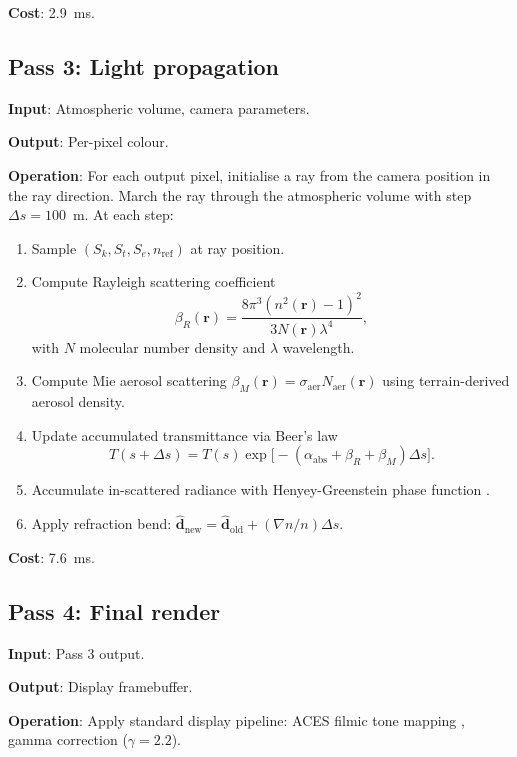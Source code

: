 \documentclass[11pt,twocolumn,a4paper]{article}
\theoremstyle{definition}
\theoremstyle{remark}
\newcommand{\Rvec}{\mathbf{r}}
\begin{document}
\textbf{Cost}: 2.9~ms.

\subsection{Pass 3: Light propagation}

\textbf{Input}: Atmospheric volume, camera parameters.

\textbf{Output}: Per-pixel colour.

\textbf{Operation}: For each output pixel, initialise a ray from the camera position in the ray direction. March the ray through the atmospheric volume with step $\Delta s = 100$~m. At each step:

\begin{enumerate}[nosep,leftmargin=1em]
\item Sample $(S_k, S_t, S_e, n_\text{ref})$ at ray position.
\item Compute Rayleigh scattering coefficient \citep{bohren1983}
\begin{equation}
\beta_R(\Rvec) = \frac{8\pi^3(n^2(\Rvec)-1)^2}{3 N(\Rvec)\lambda^4},
\end{equation}
with $N$ molecular number density and $\lambda$ wavelength.
\item Compute Mie aerosol scattering $\beta_M(\Rvec) = \sigma_\text{aer} N_\text{aer}(\Rvec)$ using terrain-derived aerosol density.
\item Update accumulated transmittance via Beer's law \citep{liou2002}
\begin{equation}
T(s+\Delta s) = T(s) \exp\big[-(\alpha_\text{abs} + \beta_R + \beta_M)\Delta s\big].
\end{equation}
\item Accumulate in-scattered radiance with Henyey-Greenstein phase function \citep{henyey1941}.
\item Apply refraction bend: $\hat{\mathbf{d}}_\text{new} = \hat{\mathbf{d}}_\text{old} + (\nabla n/n)\Delta s$.
\end{enumerate}

\textbf{Cost}: 7.6~ms.

\subsection{Pass 4: Final render}

\textbf{Input}: Pass 3 output.

\textbf{Output}: Display framebuffer.

\textbf{Operation}: Apply standard display pipeline: ACES filmic tone mapping \citep{aces2014}, gamma correction ($\gamma = 2.2$).
\end{document}
